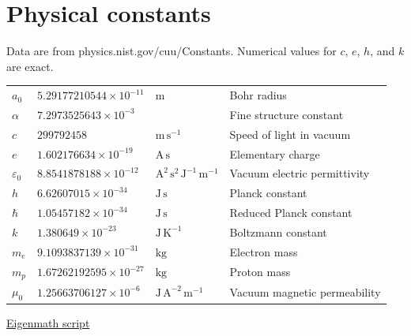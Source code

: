 

\section*{Physical constants}

Data are from physics.nist.gov/cuu/Constants.
Numerical values for $c$, $e$, $h$, and $k$ are exact.

\begin{center}
\begin{tabular}{llll}
$a_0$ & $5.29177210544\times10^{-11}$ & $\text{m}$ & Bohr radius
\\[1ex]
$\alpha$
& $7.2973525643\times10^{-3}$
&
& Fine structure constant
\\[1ex]
$c$
& $299792458$
& $\text{m}\,\text{s}^{-1}$
& Speed of light in vacuum
\\[1ex]
$e$
& $1.602176634\times10^{-19}$
& $\text{A}\,\text{s}$
& Elementary charge
\\[1ex]
$\varepsilon_0$
& $8.8541878188\times10^{-12}$
& $\text{A}^2\,\text{s}^2\,\text{J}^{-1}\,\text{m}^{-1}$
& Vacuum electric permittivity
\\[1ex]
$h$
& $6.62607015\times10^{-34}$
& $\text{J}\,\text{s}$
& Planck constant
\\[1ex]
$\hbar$
& $1.05457182\times10^{-34}$
& $\text{J}\,\text{s}$
& Reduced Planck constant
\\[1ex]
$k$
& $1.380649\times10^{-23}$
& $\text{J}\,\text{K}^{-1}$
& Boltzmann constant
\\[1ex]
$m_e$
& $9.1093837139\times10^{-31}$
& $\text{kg}$
& Electron mass
\\[1ex]
$m_p$
& $1.67262192595\times10^{-27}$
& $\text{kg}$
& Proton mass
\\[1ex]
$\mu_0$
& $1.25663706127\times10^{-6}$
& $\text{J}\,\text{A}^{-2}\,\text{m}^{-1}$
& Vacuum magnetic permeability
\end{tabular}
\end{center}

\href{https://georgeweigt.github.io/examples/physical-constants-demo.html}{Eigenmath script}


